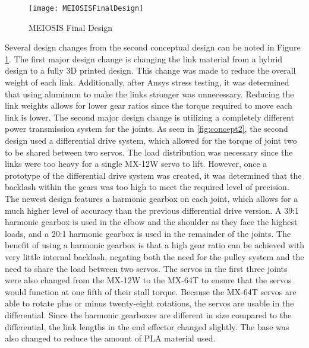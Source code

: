 \begin{figure}[htp]
  \centering
  \texttt{[image: MEIOSISFinalDesign]}
  \caption{MEIOSIS Final Design}
  \label{fig:MEIOSISFinalDesign}
\end{figure}

Several design changes from the second conceptual design can be noted in Figure \ref{fig:MEIOSISFinalDesign}. The first major design change is changing the link material from a hybrid design to a fully 3D printed design. This change was made to reduce the overall weight of each link. Additionally, after Ansys stress testing, it was determined that using aluminum to make the links stronger was unnecessary. Reducing the link weights allows for lower gear ratios since the torque required to move each link is lower. The second major design change is utilizing a completely different power transmission system for the joints. As seen in \ref{fig:concept2}, the second design used a differential drive system, which allowed for the torque of joint two to be shared between two servos. The load distribution was necessary since the links were too heavy for a single MX-12W servo to lift. However, once a prototype of the differential drive system was created, it was determined that the backlash within the gears was too high to meet the required level of precision. The newest design features a harmonic gearbox on each joint, which allows for a much higher level of accuracy than the previous differential drive version. A 39:1 harmonic gearbox is used in the elbow and the shoulder as they face the highest loads, and a 20:1 harmonic gearbox is used in the remainder of the joints. The benefit of using a harmonic gearbox is that a high gear ratio can be achieved with very little internal backlash, negating both the need for the pulley system and the need to share the load between two servos. The servos in the first three joints were also changed from the MX-12W to the MX-64T to ensure that the servos would function at one fifth of their stall torque. Because the MX-64T servos are able to rotate plus or minus twenty-eight rotations, the servos are usable in the differential. Since the harmonic gearboxes are different in size compared to the differential, the link lengths in the end effector changed slightly. The base was also changed to reduce the amount of PLA material used.
